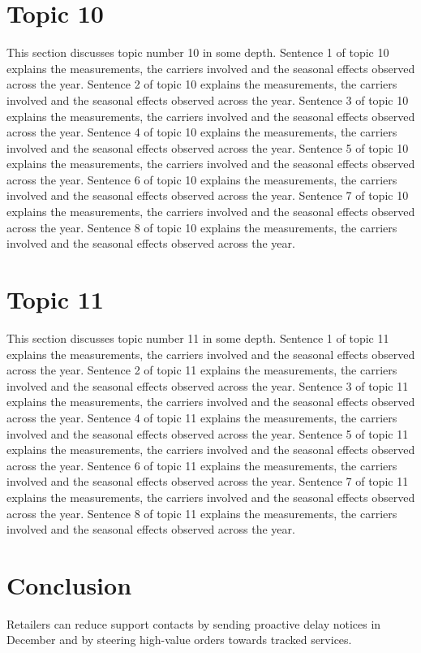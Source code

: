 \documentclass[twocolumn,10pt]{article}
\begin{document}
\section{Topic 10}
This section discusses topic number 10 in some depth. Sentence 1 of topic 10 explains the measurements, the carriers involved and the seasonal effects observed across the year. Sentence 2 of topic 10 explains the measurements, the carriers involved and the seasonal effects observed across the year. Sentence 3 of topic 10 explains the measurements, the carriers involved and the seasonal effects observed across the year. Sentence 4 of topic 10 explains the measurements, the carriers involved and the seasonal effects observed across the year. Sentence 5 of topic 10 explains the measurements, the carriers involved and the seasonal effects observed across the year. Sentence 6 of topic 10 explains the measurements, the carriers involved and the seasonal effects observed across the year. Sentence 7 of topic 10 explains the measurements, the carriers involved and the seasonal effects observed across the year. Sentence 8 of topic 10 explains the measurements, the carriers involved and the seasonal effects observed across the year.
\section{Topic 11}
This section discusses topic number 11 in some depth. Sentence 1 of topic 11 explains the measurements, the carriers involved and the seasonal effects observed across the year. Sentence 2 of topic 11 explains the measurements, the carriers involved and the seasonal effects observed across the year. Sentence 3 of topic 11 explains the measurements, the carriers involved and the seasonal effects observed across the year. Sentence 4 of topic 11 explains the measurements, the carriers involved and the seasonal effects observed across the year. Sentence 5 of topic 11 explains the measurements, the carriers involved and the seasonal effects observed across the year. Sentence 6 of topic 11 explains the measurements, the carriers involved and the seasonal effects observed across the year. Sentence 7 of topic 11 explains the measurements, the carriers involved and the seasonal effects observed across the year. Sentence 8 of topic 11 explains the measurements, the carriers involved and the seasonal effects observed across the year.
\section{Conclusion}
Retailers can reduce support contacts by sending proactive delay notices in December and by steering high-value orders towards tracked services.
\end{document}
